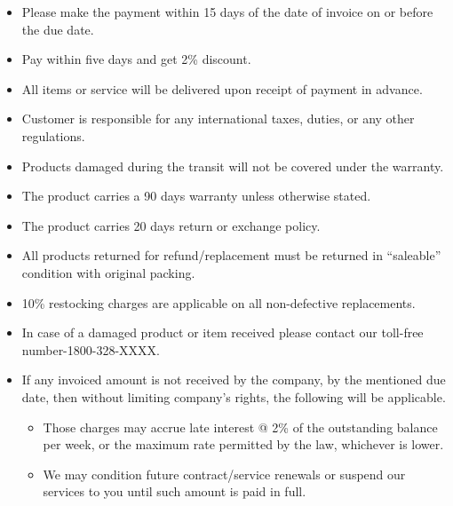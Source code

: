 \begin{itemize}[nosep]
\item Please make the payment within 15 days of the date of invoice on or before the due date.
\item Pay within five days and get 2\% discount.
\item All items or service will be delivered upon receipt of payment in advance.
\item Customer is responsible for any international taxes, duties, or any other regulations.
\item Products damaged during the transit will not be covered under the warranty.
\item The product carries a 90 days warranty unless otherwise stated.
\item The product carries 20 days return or exchange policy.
\item All products returned for refund/replacement must be returned in ``saleable'' condition with original packing.
\item 10\% restocking charges are applicable on all non-defective replacements.
\item In case of a damaged product or item received please contact our toll-free number-1800-328-XXXX.
\item If any invoiced amount is not received by the company, by the mentioned due date, then without limiting company’s rights, the following will be applicable.
\begin{itemize}[nosep,label=$\circ$]
\item Those charges may accrue late interest @ 2\% of the outstanding balance per week, or the maximum rate permitted by the law, whichever is lower.
\item We may condition future contract/service renewals or suspend our services to you until such amount is paid in full.
\end{itemize}
\end{itemize}


